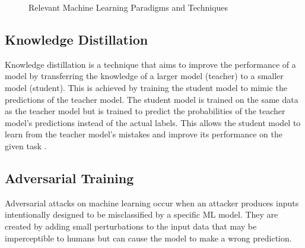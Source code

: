 \documentclass[../main.tex]{subfiles}
\begin{document}

     \newpage

    \begin{figure}
        \centering
        \caption{Relevant Machine Learning Paradigms and Techniques}
        \resizebox*{1.1\columnwidth}{!}{
            \hspace*{-3cm}
            
        }
        \label{fig:relevant_ml_paradigms}
    \end{figure}
    \clearpage

     \subsection{Knowledge Distillation} \label{sec:knowledge_distillation} 

    Knowledge distillation is a technique that aims to improve the performance of a model by transferring the knowledge of a larger model (teacher) to a smaller model (student). This is achieved by training the student model to mimic the predictions of the teacher model. The student model is trained on the same data as the teacher model but is trained to predict the probabilities of the teacher model's predictions instead of the actual labels. This allows the student model to learn from the teacher model's mistakes and improve its performance on the given task \cite{hinton_distilling_2015}.
    


    \subsection{Adversarial Training} \label{sec:adversarial_training} 

    Adversarial attacks on machine learning occur when an attacker produces inputs intentionally designed to be misclassified by a specific ML model. They are created by adding small perturbations to the input data that may be imperceptible to humans but can cause the model to make a wrong prediction.
    
\end{document}
